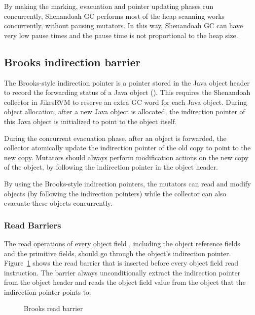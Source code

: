 By making the marking, evacuation and pointer updating phases run concurrently, Shenandoah GC performs
most of the heap scanning works concurrently, without pausing mutators. In this way,
Shenandoah GC can have very low pause times and the pause time is not proportional
to the heap size.

\subsection{Brooks indirection barrier}


The Brooks-style indirection pointer is a pointer stored in the Java object header
to record the forwarding status of a Java object (\cite{flood2016shenandoah}).
This requires the Shenandoah collector in JikesRVM to reserve an extra GC word for each
Java object. During object allocation, after a new Java object is allocated, the indirection
pointer of this Java object is initialized to point to the object itself.

During the concurrent evacuation phase, after an object is forwarded,
the collector atomically update the indirection pointer of the old copy to point to the new copy.
Mutators should always perform modification actions on the new copy of the object,
by following the indirection pointer in the object header.

By using the Brooks-style indirection pointers, the mutators can read and modify objects
(by following the indirection pointers) while the collector can also evacuate these
objects concurrently.

\subsubsection{Read Barriers}

The read operations of every object field , including the object
reference fields and the primitive fields, should go through the object's indirection pointer.
Figure~\ref{fig:brooksreadbarrier} shows the read barrier that is inserted before every object field read instruction.
The barrier always unconditionally extract the indirection pointer from the object header
and reads the object field value from the object that the indirection pointer points to.

\begin{figure}
  \centering
  
  \caption{Brooks read barrier}
  \label{fig:brooksreadbarrier}
\end{figure}


